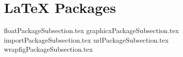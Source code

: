 \documentclass[class=book , crop=false]{standalone}
\begin{document}
	\section{\LaTeX{} Packages}

		{floatPackageSubsection.tex}
		{graphicxPackageSubsection.tex}
		{importPackageSubsection.tex}
		{urlPackageSubsection.tex}
		{wrapfigPackageSubsection.tex}
		
\end{document}
